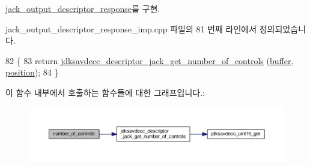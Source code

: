 \hyperlink{classavdecc__lib_1_1jack__output__descriptor__response_a5accf7abc7d231a0767ad5cac68b8b39}{jack\+\_\+output\+\_\+descriptor\+\_\+response}를 구현.



jack\+\_\+output\+\_\+descriptor\+\_\+response\+\_\+imp.\+cpp 파일의 81 번째 라인에서 정의되었습니다.


\begin{DoxyCode}
82 \{
83     \textcolor{keywordflow}{return} \hyperlink{group__descriptor__jack_ga519ff673725c6cc9157798a24bf1876d}{jdksavdecc\_descriptor\_jack\_get\_number\_of\_controls}
      (\hyperlink{classavdecc__lib_1_1descriptor__response__base__imp_a56ed84df35de10bdb65e72b184309497}{buffer}, \hyperlink{classavdecc__lib_1_1descriptor__response__base__imp_a7a04afe5347934be732ec70a70bd0a28}{position});
84 \}
\end{DoxyCode}


이 함수 내부에서 호출하는 함수들에 대한 그래프입니다.\+:
\nopagebreak
\begin{figure}[H]
\begin{center}
\leavevmode
\includegraphics[width=350pt]{classavdecc__lib_1_1jack__output__descriptor__response__imp_abdf54b1d2b03f5f2b7346ddc9d93df5c_cgraph}
\end{center}
\end{figure}


